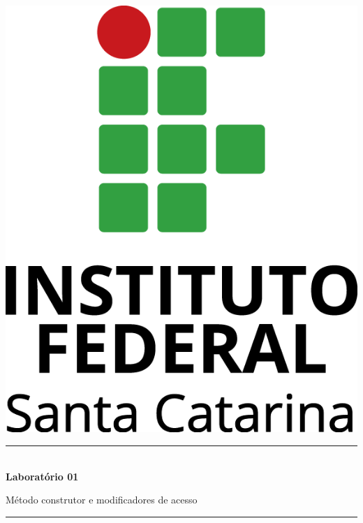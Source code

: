 \documentclass[11pt]{article}
\begin{document}
\pagestyle{empty}	
\begin{titlepage}
\begin{center}
\includegraphics[scale=.5]{figuras/ifsc-logo-v}
\vspace{4cm}

\rule{\linewidth}{0.5pt} \\[6pt] 

{\huge \bfseries Laboratório 01}

{\large  Método construtor e modificadores de acesso}\\

\rule{\linewidth}{2pt}  \\[10pt]
\vspace{1cm}
\end{center}

\begin{minipage}{.9\linewidth}


\end{minipage}
\end{titlepage}
\end{document}
